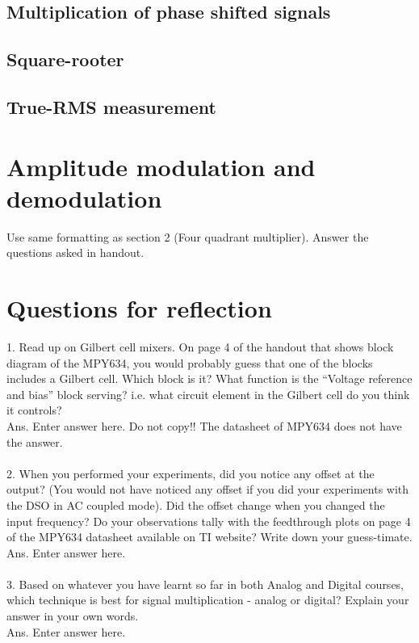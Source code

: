\documentclass[12pt]{article}
\begin{document}
\subsection{Multiplication of phase shifted signals}

\subsection{Square-rooter}

\subsection{True-RMS measurement}

\section{Amplitude modulation and demodulation}

Use same formatting as section 2 (Four quadrant multiplier). Answer the questions asked in handout.

\section{Questions for reflection}

1. Read up on Gilbert cell mixers. On page 4 of the handout that shows block diagram of the MPY634, you would probably guess that one of the blocks includes a Gilbert cell. Which block is it? What function is the ``Voltage reference and bias'' block serving? i.e. what circuit element in the Gilbert cell do you think it controls?\\
Ans. Enter answer here. Do not copy!! The datasheet of MPY634 does not have the answer.
\\\\
2. When you performed your experiments, did you notice any offset at the output? (You would not have noticed any offset if you did your experiments with the DSO in AC coupled mode). Did the offset change when you changed the input frequency? Do your observations tally with the feedthrough plots on page 4 of the MPY634 datasheet available on TI website? Write down your guess-timate.\\
Ans. Enter answer here.
\\\\
3. Based on whatever you have learnt so far in both Analog and Digital courses, which technique is best for signal multiplication - analog or digital? Explain your answer in your own words.\\
Ans. Enter answer here.
\\\\
\end{document}

